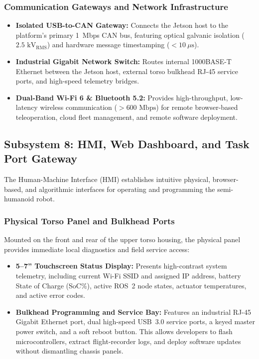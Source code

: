 \subsubsection{Communication Gateways and Network Infrastructure}
\begin{itemize}[leftmargin=1.5em]
  \item \textbf{Isolated USB-to-CAN Gateway:} Connects the Jetson host to the platform's primary 1~Mbps CAN bus, featuring optical galvanic isolation ($2.5\text{ kV}_{\text{RMS}}$) and hardware message timestamping ($<10\ \mu\text{s}$).
  \item \textbf{Industrial Gigabit Network Switch:} Routes internal 1000BASE-T Ethernet between the Jetson host, external torso bulkhead RJ-45 service ports, and high-speed telemetry bridges.
  \item \textbf{Dual-Band Wi-Fi 6 \& Bluetooth 5.2:} Provides high-throughput, low-latency wireless communication ($>600\text{ Mbps}$) for remote browser-based teleoperation, cloud fleet management, and remote software deployment.
\end{itemize}

\subsection{Subsystem 8: HMI, Web Dashboard, and Task Port Gateway}
\label{subsec:subsystem_8_hmi}
The Human-Machine Interface (HMI) establishes intuitive physical, browser-based, and algorithmic interfaces for operating and programming the semi-humanoid robot.

\subsubsection{Physical Torso Panel and Bulkhead Ports}
Mounted on the front and rear of the upper torso housing, the physical panel provides immediate local diagnostics and field service access:
\begin{itemize}[leftmargin=1.5em]
  \item \textbf{5--7'' Touchscreen Status Display:} Presents high-contrast system telemetry, including current Wi-Fi SSID and assigned IP address, battery State of Charge (SoC\%), active ROS~2 node states, actuator temperatures, and active error codes.
  \item \textbf{Bulkhead Programming and Service Bay:} Features an industrial RJ-45 Gigabit Ethernet port, dual high-speed USB~3.0 service ports, a keyed master power switch, and a soft reboot button. This allows developers to flash microcontrollers, extract flight-recorder logs, and deploy software updates without dismantling chassis panels.
\end{itemize}

